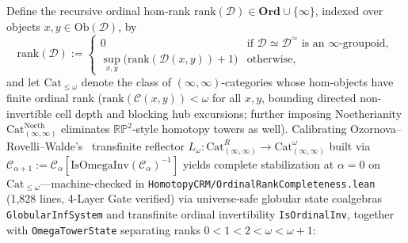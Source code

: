 \documentclass[10pt,twoside,openright]{book}
\theoremstyle{crmplain}
\theoremstyle{crmdef}
\theoremstyle{crmremark}
\begin{document}
Define the recursive ordinal hom-rank $\mathrm{rank}(\mathcal{D}) \in \mathbf{Ord} \cup \{\infty\}$, indexed over objects $x, y \in \mathrm{Ob}(\mathcal{D})$, by
\[
  \mathrm{rank}(\mathcal{D}) := \begin{cases}
    0 & \text{if } \mathcal{D} \simeq \mathcal{D}^{\simeq} \text{ is an $\infty$-groupoid}, \\[2pt]
    \sup_{x, y} \bigl(\mathrm{rank}(\mathcal{D}(x, y)) + 1\bigr) & \text{otherwise,}
  \end{cases}
\]
and let $\mathrm{Cat}_{\le \omega}$ denote the class of $(\infty, \infty)$-categories whose hom-objects have finite ordinal rank ($\mathrm{rank}(\mathcal{C}(x, y)) < \omega$ for all $x, y$, bounding directed non-invertible cell depth and blocking hub excursions; further imposing Noetherianity $\mathrm{Cat}^{\mathrm{Noeth}}_{(\infty,\infty)}$ eliminates $\mathbb{R}\mathbb{P}^2$-style homotopy towers as well). Calibrating Ozornova--Rovelli--Walde's~\cite[Questions~5.60 and~5.62 (v1 Question~5.58)]{ORW26} transfinite reflector $L_\omega : \mathrm{Cat}^R_{(\infty, \infty)} \to \mathrm{Cat}^\omega_{(\infty, \infty)}$ built via $\mathcal{C}_{\alpha+1} :=\allowbreak \mathcal{C}_\alpha[\mathrm{IsOmegaInv}\allowbreak(\mathcal{C}_\alpha)^{-1}]$ yields complete stabilization at $\alpha = 0$ on $\mathrm{Cat}_{\le \omega}$---machine-checked in \texttt{HomotopyCRM/\allowbreak Ordinal\allowbreak Rank\allowbreak Completeness.lean} (1,828 lines, 4-Layer Gate verified) via universe-safe globular state coalgebras \texttt{Globular\allowbreak Inf\allowbreak System} and transfinite ordinal invertibility \texttt{Is\allowbreak Ordinal\allowbreak Inv}, together with \texttt{Omega\allowbreak Tower\allowbreak State} separating ranks $0 < 1 < 2 < \omega < \omega + 1$:
\end{document}
